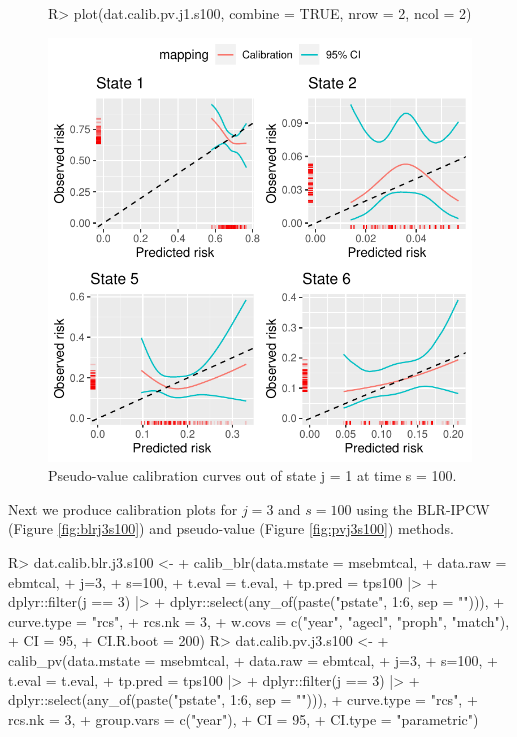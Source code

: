 \documentclass[article,shortnames]{jss}
\begin{document}
\begin{figure}
\centering
\begin{Schunk}
\begin{Sinput}
R> plot(dat.calib.pv.j1.s100, combine = TRUE, nrow = 2, ncol = 2)
\end{Sinput}
\end{Schunk}
\includegraphics{calibmsm-jss-20230613-013}
\caption{\label{fig:pvj1s100} Pseudo-value calibration curves out of state j =  1 at time s = 100.}
\end{figure}

Next we produce calibration plots for $j = 3$ and $s = 100$ using the BLR-IPCW (Figure \ref{fig:blrj3s100}) and pseudo-value (Figure \ref{fig:pvj3s100}) methods.

\begin{Schunk}
\begin{Sinput}
R> dat.calib.blr.j3.s100 <-
+    calib_blr(data.mstate = msebmtcal,
+                   data.raw = ebmtcal,
+                   j=3,
+                   s=100,
+                   t.eval = t.eval,
+                   tp.pred = tps100 |>
+                     dplyr::filter(j == 3) |>
+                     dplyr::select(any_of(paste("pstate", 1:6, sep = ""))),
+                   curve.type = "rcs",
+                   rcs.nk = 3,
+                   w.covs = c("year", "agecl", "proph", "match"),
+                   CI = 95,
+                   CI.R.boot = 200)
R> dat.calib.pv.j3.s100 <-
+    calib_pv(data.mstate = msebmtcal,
+                  data.raw = ebmtcal,
+                  j=3,
+                  s=100,
+                  t.eval = t.eval,
+                  tp.pred = tps100 |>
+                   dplyr::filter(j == 3) |>
+                   dplyr::select(any_of(paste("pstate", 1:6, sep = ""))),
+                  curve.type = "rcs",
+                  rcs.nk = 3,
+                  group.vars = c("year"),
+                  CI = 95,
+                  CI.type = "parametric")
\end{Sinput}
\end{Schunk}
\end{document}
